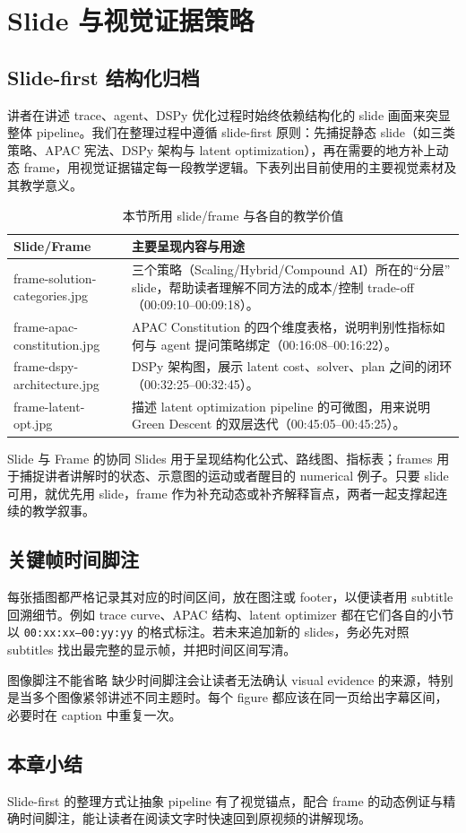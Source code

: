 \section{Slide 与视觉证据策略}

\subsection{Slide-first 结构化归档}
讲者在讲述 trace、agent、DSPy 优化过程时始终依赖结构化的 slide 画面来突显整体 pipeline。我们在整理过程中遵循 slide-first 原则：先捕捉静态 slide（如三类策略、APAC 宪法、DSPy 架构与 latent optimization），再在需要的地方补上动态 frame，用视觉证据锚定每一段教学逻辑。下表列出目前使用的主要视觉素材及其教学意义。
\begin{table}[H]
\centering
\begin{tabular}{lp{8cm}}
\toprule
Slide/Frame & 主要呈现内容与用途 \\
\midrule
frame-solution-categories.jpg & 三个策略（Scaling/Hybrid/Compound AI）所在的“分层” slide，帮助读者理解不同方法的成本/控制 trade-off（00:09:10--00:09:18）。 \\
frame-apac-constitution.jpg & APAC Constitution 的四个维度表格，说明判别性指标如何与 agent 提问策略绑定（00:16:08--00:16:22）。 \\
frame-dspy-architecture.jpg & DSPy 架构图，展示 latent cost、solver、plan 之间的闭环（00:32:25--00:32:45）。 \\
frame-latent-opt.jpg & 描述 latent optimization pipeline 的可微图，用来说明 Green Descent 的双层迭代（00:45:05--00:45:25）。 \\
\bottomrule
\end{tabular}
\caption{本节所用 slide/frame 与各自的教学价值}
\end{table}
\begin{knowledgebox}{Slide 与 Frame 的协同}
Slides 用于呈现结构化公式、路线图、指标表；frames 用于捕捉讲者讲解时的状态、示意图的运动或者醒目的 numerical 例子。只要 slide 可用，就优先用 slide，frame 作为补充动态或补齐解释盲点，两者一起支撑起连续的教学叙事。
\end{knowledgebox}

\subsection{关键帧时间脚注}
每张插图都严格记录其对应的时间区间，放在图注或 footer，以便读者用 subtitle 回溯细节。例如 trace curve、APAC 结构、latent optimizer 都在它们各自的小节以 \texttt{00:xx:xx--00:yy:yy} 的格式标注。若未来追加新的 slides，务必先对照 subtitles 找出最完整的显示帧，并把时间区间写清。
\begin{warningbox}{图像脚注不能省略}
缺少时间脚注会让读者无法确认 visual evidence 的来源，特别是当多个图像紧邻讲述不同主题时。每个 figure 都应该在同一页给出字幕区间，必要时在 caption 中重复一次。
\end{warningbox}

\subsection{本章小结}
Slide-first 的整理方式让抽象 pipeline 有了视觉锚点，配合 frame 的动态例证与精确时间脚注，能让读者在阅读文字时快速回到原视频的讲解现场。

